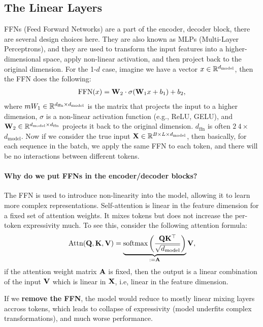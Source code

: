 \documentclass[11pt]{article}  %
\begin{document}
\subsection{The Linear Layers}
FFNs (Feed Forward Networks) are a part of the encoder, decoder block, there are several design choices here.
They are also known as MLPs (Multi-Layer Perceptrons), and they are used to transform the input features into a higher-dimensional space, apply non-linear activation, and then project back to the original dimension.
For the 1-$d$ case, imagine we have a vector $x \in \mathbb{R}^{d_{\text{model}}}$, then the FFN does the following:
\begin{align*}
  \text{FFN}(x) = \mathbf{W}_2\cdot\sigma(\mathbf{W}_1 x + b_1) + b_2,
\end{align*}
where $mW_1 \in \mathbb{R}^{d_{\text{ffn}} \times d_{\text{model}}}$ is the matrix that projects the input to a higher dimension, $\sigma$ is a non-linear activation function (e.g., ReLU, GELU), and $\mathbf{W}_2 \in \mathbb{R}^{d_{\text{model}} \times d_{\text{ffn}}}$ projects it back to the original dimension.
$d_{\text{ffn}}$ is often $2 ~ 4 \times$ $d_{\text{model}}$.
Now if we consider the true input $\mathbf{X} \in \mathbb{R}^{B \times L \times d_{\text{model}}}$, then basically, for each sequence in the batch, we apply the same FFN to each token, and there will be no interactions between different tokens.

\paragraph{Why do we put FFNs in the encoder/decoder blocks?}
The FFN is used to introduce non-linearity into the model, allowing it to learn more complex representations. 
Self-attention is linear in the feature dimension for a fixed set of attention weights.
It mixes tokens but does not increase the per-token expressivity much.
To see this, consider the following attention formula:
\begin{align*}
  \text{Attn}(\mathbf{Q}, \mathbf{K}, \mathbf{V}) = \underbrace{\text{softmax}\left(\frac{\mathbf{Q}\mathbf{K}^\top}{\sqrt{d_{\text{model}}}}\right)}_{:= \mathbf{A}}\mathbf{V},
\end{align*}
if the attention weight matrix $\mathbf{A}$ is fixed, then the output is a linear combination of the input $\mathbf{V}$ which is linear in $\mathbf{X}$, i.e, linear in the feature dimension.

If we \textbf{remove the FFN}, the model would reduce to mostly linear mixing layers accross tokens, which leads to collapse of expressivity (model underfits complex transformations), and much worse performance.
\end{document}
